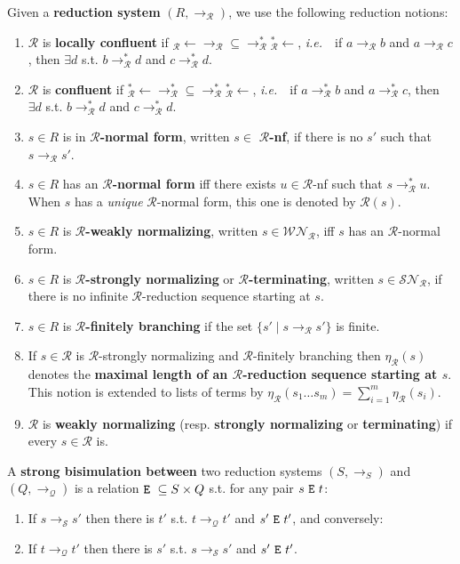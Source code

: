 \documentclass{LMCS}
\newcommand{\ie}{{\it  i.e.}~}
\renewcommand{\>}{\rightarrow}
\newcommand{\Rew}[1]{\rightarrow_{#1}}
\newcommand{\Rewn}[2][*]{\rightarrow^{#1}_{#2}}
\newcommand{\SN}[1]{\mathcal{SN}_{#1}}
\newcommand{\WN}[1]{\mathcal{WN}_{#1}}
\newcommand{\ttE}{{\tt E}}
\newcommand{\R}{\mathcal{R}}
\renewcommand{\S}{\mathcal{S}}
\newcommand{\Q}{\mathcal{Q}}
\newcommand{\LRew}[1]{\mbox{}_{#1}{\leftarrow} }
\newcommand{\LRewn}[1]{\mbox{}^{*}_{#1}{\leftarrow}}
\newcommand{\set}[1]{ \{ #1 \}}
\newcommand{\deft}[1]{{\bf #1}}
\begin{document}
Given a \deft{reduction system} $(R, \Rew{\R})$,  we use the following reduction notions: 
\begin{enumerate}[$\bullet$]
  \item $\R$ is \deft{locally confluent} if 
$\LRew{\R} \Rew{\R}\subseteq \Rewn{\R} \LRewn{\R}$,  \ie\ 
if $a \Rew{\R} b$ and $a \Rew{\R} c$, then $\exists d$ s.t.
$b \Rewn{\R} d$ and $c \Rewn{\R} d$.
 \item $\R$ is \deft{confluent} if $\LRewn{\R}\Rewn{\R}\subseteq \Rewn{\R} \LRewn{\R}$,  \ie\ 
if $a \Rewn{\R} b$ and $a \Rewn{\R} c$, then $\exists d$ s.t.
$b \Rewn{\R} d$ and $c \Rewn{\R} d$.
\item $s \in R$ is in \deft{$\R$-normal form}, written $s \in$ \deft{$\R$-nf}, if there is no $s'$ such that $s\Rew{\R} s'$.  
\item $s\in R$ has an \deft{$\R$-normal form} iff there exists $u \in \R$-nf
such that $s \Rewn{\R} u$. 
When  $s$ has a \textit{unique} $\R$-normal form, this one is denoted by $\R(s)$.
\item $s\in R$ is  \deft{$\R$-weakly normalizing}, written $s \in \WN{\R}$,
iff $s$ has an  $\R$-normal form.
\item  $s\in R$   is  \deft{$\R$-strongly  normalizing} or
\deft{$\R$-terminating},   written  $s  \in
  \SN{\R}$, if  there is no infinite  $\R$-reduction sequence starting
  at  $s$.
 \item $s\in R$   is  \deft{$\R$-finitely branching}
       if the set $\set{ s' \mid s \Rew{\R} s'}$ is finite.
\item If $s \in \R$ is  $\R$-strongly  normalizing
and $\R$-finitely branching
then $\eta_{\R}(s)$  
denotes  the
  \deft{maximal length of an $\R$-reduction sequence starting at $s$}.
  This notion is  extended to  lists of terms
   by $\eta_{\R}(s_1 \ldots s_m)= \sum_{i=1}^{m} \eta_{\R}(s_i)$.
\item $\R$ is \deft{weakly normalizing} (resp. \deft{strongly  normalizing} or \deft{terminating})
if every $s \in \R$ is.
\end{enumerate}

A \deft{strong bisimulation between} two
reduction
systems 
$(S, \Rew{S})$ and $(Q, \Rew{\Q})$ is a
relation $\ttE\ \subseteq S \times Q$ s.t. for any pair
$s\ \ttE\ t$:
\begin{enumerate}[$\bullet$]
   \item If $s \Rew{\S} s'$ then 
        there is  $t'$ s.t. 
        $t \Rew{\Q} t'$ and $s'\ \ttE\ t'$, and conversely:
   \item If $t \Rew{\Q} t'$ then there is $s'$ s.t. $s\Rew{\S} s'$ and $s'\ \ttE\ t'$.
  \end{enumerate}
\end{document}
